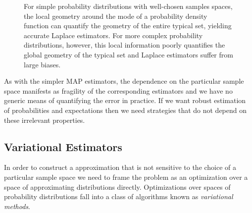 \documentclass[11pt, oneside]{article}
\begin{document}
\begin{figure*}
\centering
{}
\caption{For simple probability distributions with well-chosen
samples spaces, the local geometry around the mode of a 
probability density function can quantify the geometry of the 
entire typical set, yielding accurate Laplace estimators. For
more complex probability distributions, however, this local
information poorly quantifies the global geometry of the 
typical set and Laplace estimators suffer from large biases.
}
\label{fig:laplace}
\end{figure*}

As with the simpler MAP estimators, the dependence on the particular
sample space manifests as fragility of the corresponding estimators
and we have no generic means of quantifying the error in practice.  
If we want robust estimation of probabilities and expectations then we 
need strategies that do not depend on these irrelevant properties.

\subsection{Variational Estimators}

In order to construct a approximation that is not sensitive to the choice 
of a particular sample space we need to frame the problem as an 
optimization over a space of approximating distributions directly.
Optimizations over spaces of probability distributions fall into a class 
of algorithms known as \emph{variational methods}.
\end{document}
